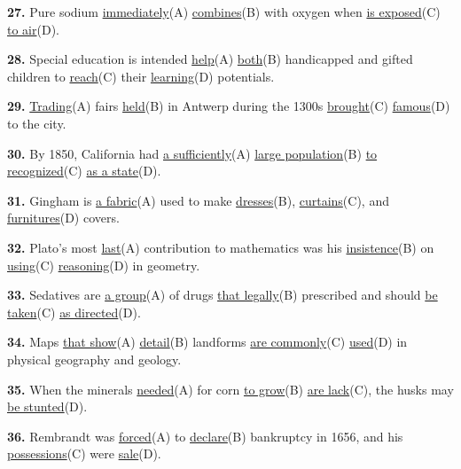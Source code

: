 \documentclass[12pt]{article}
\begin{document}
\par
\vspace{\questionblockgap}
\noindent\textbf{27.} Pure sodium \uline{immediately}(A) \uline{combines}(B) with oxygen when \uline{is exposed}(C) \uline{to air}(D).
\par
\vspace{\questionblockgap}
\noindent\textbf{28.} Special education is intended \uline{help}(A) \uline{both}(B) handicapped and gifted children to \uline{reach}(C) their \uline{learning}(D) potentials.
\par
\vspace{\questionblockgap}
\noindent\textbf{29.} \uline{Trading}(A) fairs \uline{held}(B) in Antwerp during the 1300s \uline{brought}(C) \uline{famous}(D) to the city.
\par
\vspace{\questionblockgap}
\noindent\textbf{30.} By 1850, California had \uline{a sufficiently}(A) \uline{large population}(B) \uline{to recognized}(C) \uline{as a state}(D).
\par
\vspace{\questionblockgap}
\noindent\textbf{31.} Gingham is \uline{a fabric}(A) used to make \uline{dresses}(B), \uline{curtains}(C), and \uline{furnitures}(D) covers.
\par
\vspace{\questionblockgap}
\noindent\textbf{32.} Plato's most \uline{last}(A) contribution to mathematics was his \uline{insistence}(B) on \uline{using}(C) \uline{reasoning}(D) in geometry.
\par
\vspace{\questionblockgap}
\noindent\textbf{33.} Sedatives are \uline{a group}(A) of drugs \uline{that legally}(B) prescribed and should \uline{be taken}(C) \uline{as directed}(D).
\par
\vspace{\questionblockgap}
\noindent\textbf{34.} Maps \uline{that show}(A) \uline{detail}(B) landforms \uline{are commonly}(C) \uline{used}(D) in physical geography and geology.
\par
\vspace{\questionblockgap}
\noindent\textbf{35.} When the minerals \uline{needed}(A) for corn \uline{to grow}(B) \uline{are lack}(C), the husks may \uline{be stunted}(D).
\par
\vspace{\questionblockgap}
\noindent\textbf{36.} Rembrandt was \uline{forced}(A) to \uline{declare}(B) bankruptcy in 1656, and his \uline{possessions}(C) were \uline{sale}(D).
\end{document}
